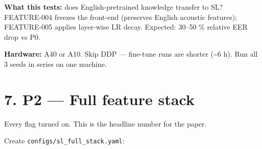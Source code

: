 \documentclass[10pt,a4paper]{article}
\begin{document}
\textbf{What this tests:} does English-pretrained knowledge transfer to SL? FEATURE-004 freezes the front-end (preserves English acoustic features); FEATURE-005 applies layer-wise LR decay. Expected: 30--50 \% relative EER drop vs P0.

\textbf{Hardware:} A40 or A10. Skip DDP --- fine-tune runs are shorter (\textasciitilde{}6 h). Run all 3 seeds in series on one machine.

\section*{7. P2 --- Full feature stack}

Every flag turned on. This is the headline number for the paper.

Create \texttt{configs/sl\_full\_stack.yaml}:
\end{document}
